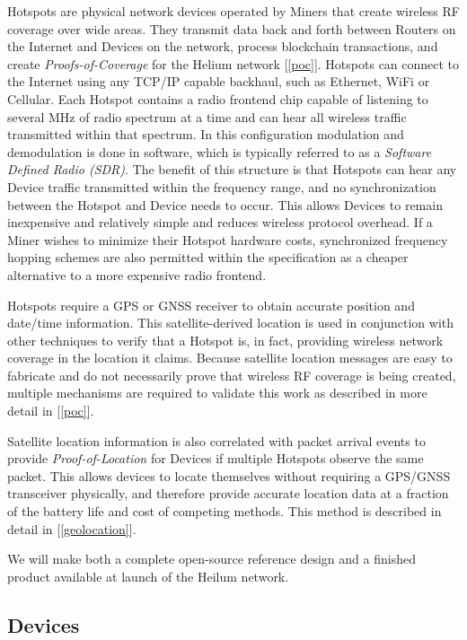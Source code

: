 \documentclass[10pt, nonatbib, nocopyrightspace, reprint]{sigplanconf}
\newcommand{\secref}[1]{[\autoref{#1}]}
\begin{document}
Hotspots are physical network devices operated by Miners that create wireless RF coverage over wide areas. They transmit data back and forth between Routers on the Internet and Devices on the network, process blockchain transactions, and create \emph{Proofs-of-Coverage} for the Helium network \secref{poc}. Hotspots can connect to the Internet using any TCP/IP capable backhaul, such as Ethernet, WiFi or Cellular. Each Hotspot contains a radio frontend chip capable of listening to several MHz of radio spectrum at a time and can hear all wireless traffic transmitted within that spectrum. In this configuration modulation and demodulation is done in software, which is typically referred to as a \emph{Software Defined Radio (SDR)}. The benefit of this structure is that Hotspots can hear any Device traffic transmitted within the frequency range, and no synchronization between the Hotspot and Device needs to occur. This allows Devices to remain inexpensive and relatively simple and reduces wireless protocol overhead. If a Miner wishes to minimize their Hotspot hardware costs, synchronized frequency hopping schemes are also permitted within the specification as a cheaper alternative to a more expensive radio frontend.

Hotspots require a GPS or GNSS receiver to obtain accurate position and date/time information. This satellite-derived location is used in conjunction with other techniques to verify that a Hotspot is, in fact, providing wireless network coverage in the location it claims. Because satellite location messages are easy to fabricate and do not necessarily prove that wireless RF coverage is being created, multiple mechanisms are required to validate this work as described in more detail in \secref{poc}.

Satellite location information is also correlated with packet arrival events to provide \emph{Proof-of-Location} for Devices if multiple Hotspots observe the same packet. This allows devices to locate themselves without requiring a GPS/GNSS transceiver physically, and therefore provide accurate location data at a fraction of the battery life and cost of competing methods. This method is described in detail in \secref{geolocation}.

We will make both a complete open-source reference design and a finished product available at launch of the Heilum network.

\subsection{Devices}\label{devices}
\end{document}
